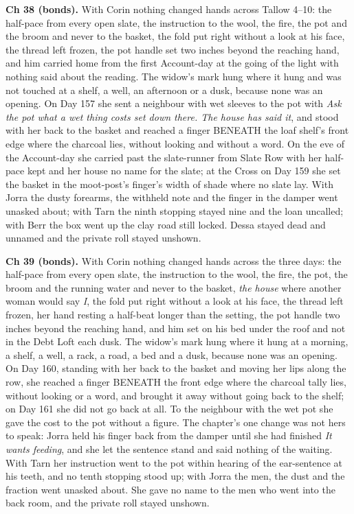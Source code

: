 \documentclass{design/chronicle}
\begin{document}
{\textbf{Ch 38 (bonds).} With Corin nothing changed hands across Tallow 4–10: the half-pace from every open slate, the instruction to the wool, the fire, the pot and the broom and never to the basket, the fold put right without a look at his face, the thread left frozen, the pot handle set two inches beyond the reaching hand, and him carried home from the first Account-day at the going of the light with nothing said about the reading. The widow’s mark hung where it hung and was not touched at a shelf, a well, an afternoon or a dusk, because none was an opening. On Day 157 she sent a neighbour with wet sleeves to the pot with \emph{Ask the pot what a wet thing costs set down there. The house has said it}, and stood with her back to the basket and reached a finger BENEATH the loaf shelf’s front edge where the charcoal lies, without looking and without a word. On the eve of the Account-day she carried past the slate-runner from Slate Row with her half-pace kept and her house no name for the slate; at the Cross on Day 159 she set the basket in the moot-post’s finger’s width of shade where no slate lay. With Jorra the dusty forearms, the withheld note and the finger in the damper went unasked about; with Tarn the ninth stopping stayed nine and the loan uncalled; with Berr the box went up the clay road still locked. Dessa stayed dead and unnamed and the private roll stayed unshown.

\textbf{Ch 39 (bonds).} With Corin nothing changed hands across the three days: the half-pace from every open slate, the instruction to the wool, the fire, the pot, the broom and the running water and never to the basket, \emph{the house} where another woman would say \emph{I}, the fold put right without a look at his face, the thread left frozen, her hand resting a half-beat longer than the setting, the pot handle two inches beyond the reaching hand, and him set on his bed under the roof and not in the Debt Loft each dusk. The widow’s mark hung where it hung at a morning, a shelf, a well, a rack, a road, a bed and a dusk, because none was an opening. On Day 160, standing with her back to the basket and moving her lips along the row, she reached a finger BENEATH the front edge where the charcoal tally lies, without looking or a word, and brought it away without going back to the shelf; on Day 161 she did not go back at all. To the neighbour with the wet pot she gave the cost to the pot without a figure. The chapter’s one change was not hers to speak: Jorra held his finger back from the damper until she had finished \emph{It wants feeding}, and she let the sentence stand and said nothing of the waiting. With Tarn her instruction went to the pot within hearing of the ear-sentence at his teeth, and no tenth stopping stood up; with Jorra the men, the dust and the fraction went unasked about. She gave no name to the men who went into the back room, and the private roll stayed unshown.

}
\end{document}
